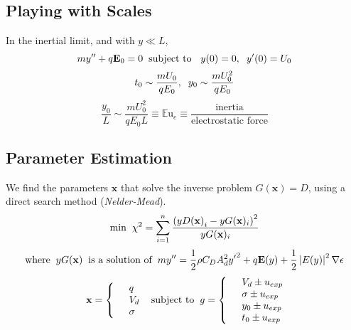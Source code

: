 \documentclass[10pt,a4paper]{article}
\author{Erin Schmidt}
\begin{document}
\subsection*{Playing with Scales}
In the inertial limit, and with $y \ll L$,
\[ m y'' + q \mathbf{E}_0 = 0 \hspace{2 mm} \mbox{subject to } \hspace{2 mm} y(0) = 0, \hspace{2 mm} y'(0) = U_0 \] 
\[ t_0 \sim \frac{m U_0}{q E_0}, \hspace{2 mm} y_0 \sim \frac{m U_0^2}{q E_0}\]
\[\frac{y_0}{L} \sim \frac{m U_0^2}{q E_0 L} \equiv {\mathbb{E}\mbox{u}}_e \equiv \frac{\mbox{inertia}}{\mbox{electrostatic force}}\]

\newpage
\subsection*{Parameter Estimation}
We find the parameters $\mathbf{x}$ that solve the inverse problem $G(\mathbf{x}) = D$, using a direct search method (\emph{Nelder-Mead}). 
\begin{equation*}
\mbox{min} \hspace{2 mm} \chi^2 = \sum^n_{i=1} \frac{\left({yD(\mathbf{x})}_i - yG(\mathbf{x})_i \right)^2}{yG(\mathbf{x})_i}
\end{equation*}
\[\mbox{where} \hspace{2 mm} yG(\mathbf{x}) \hspace{2 mm} \mbox{is a solution of} \hspace{2 mm} m y'' = \frac{1}{2} \rho C_D A_d^2 {y'}^2 + q \mathbf{E}(y) + \frac{1}{2} \left| E(y) \right|^2 \nabla \epsilon\]
\begin{eqnarray*} \mbox{} \hspace{2 mm} \begin{split} \mathbf{x} = \left\{ \begin{array}{ll}      & q\\
		  &	V_d\\
          & \sigma 
          \end{array} \right. 
          \end{split} \hspace{2 mm} \mbox{subject to} \hspace{2 mm} \begin{split}
          g = \left\{ \begin{array}{ll}
          & V_d \pm u_{exp}\\
      	  & \sigma \pm u_{exp}\\
      	  & y_0 \pm u_{exp}\\
      	  & t_0 \pm u_{exp}\\
          \end{array} \right. 
          \end{split}
\end{eqnarray*}
\end{document}
